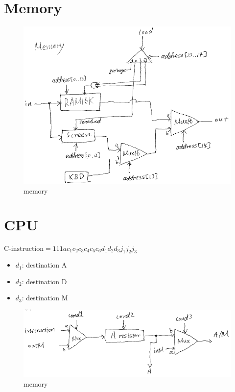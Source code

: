 \documentclass[a4paper]{book}
\begin{document}
\section{Memory}
\begin{figure}[H]
    \centering
    \includegraphics{pic/project05/memory.png}
    \caption{memory}
\end{figure}


\section{CPU}

$\text{C-instruction} = 111a c_1 c_2 c_3 c_4 c_5 c_6 d_1 d_2 d_3 j_1 j_2 j_3$

\begin{itemize}
    \item $d_1$: destination A
    \item $d_2$: destination D
    \item $d_3$: destination M
\end{itemize}


\begin{figure}[H]
    \centering
    \includegraphics{pic/project05/cpu1.png}
    \caption{memory}
\end{figure}
\end{document}
